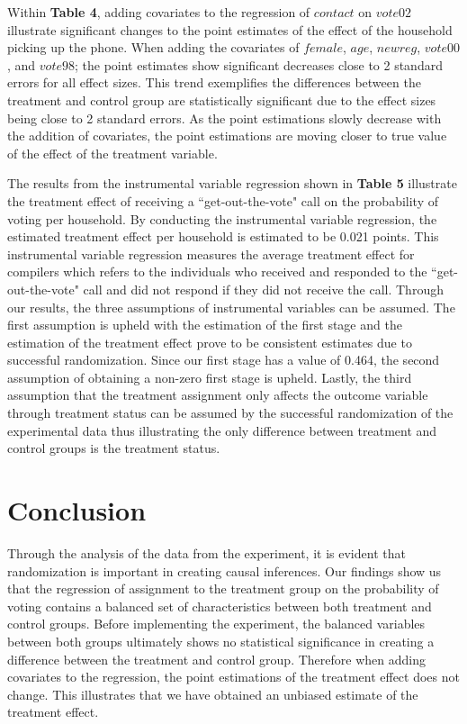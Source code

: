 \documentclass[12pt]{article}
\begin{document}
\indent Within \textbf{Table 4}, adding covariates to the regression of $contact$ on $vote02$ illustrate significant changes to the point estimates of the effect of the household picking up the phone. When adding the covariates of $female$, $age$, $newreg$, $vote00$, and $vote98$; the point estimates show significant decreases close to 2 standard errors for all effect sizes. This trend exemplifies the differences between the treatment and control group are statistically significant due to the effect sizes being close to 2 standard errors. As the point estimations slowly decrease with the addition of covariates, the point estimations are moving closer to true value of the effect of the treatment variable.

\indent The results from the instrumental variable regression shown in \textbf{Table 5} illustrate the treatment effect of receiving a ``get-out-the-vote" call on the probability of voting per household. By conducting the instrumental variable regression, the estimated treatment effect per household is estimated to be 0.021 points. This instrumental variable regression measures the average treatment effect for compilers which refers to the individuals who received and responded to the ``get-out-the-vote" call and did not respond if they did not receive the call. Through our results, the three assumptions of instrumental variables can be assumed. The first assumption is upheld with the estimation of the first stage and the estimation of the treatment effect prove to be consistent estimates due to successful randomization. Since our first stage has a value of 0.464, the second assumption of obtaining a non-zero first stage is upheld. Lastly, the third assumption that the treatment assignment only affects the outcome variable through treatment status can be assumed by the successful randomization of the experimental data thus illustrating the only difference between treatment and control groups is the treatment status.

\section{Conclusion}
\indent Through the analysis of the data from the experiment, it is evident that randomization is important in creating causal inferences. Our findings show us that the regression of assignment to the treatment group on the probability of voting contains a balanced set of characteristics between both treatment and control groups. Before implementing the experiment, the balanced variables between both groups ultimately shows no statistical significance in creating a difference between the treatment and control group. Therefore when adding covariates to the regression, the point estimations of the treatment effect does not change. This illustrates that we have obtained an unbiased estimate of the treatment effect.
\end{document}
